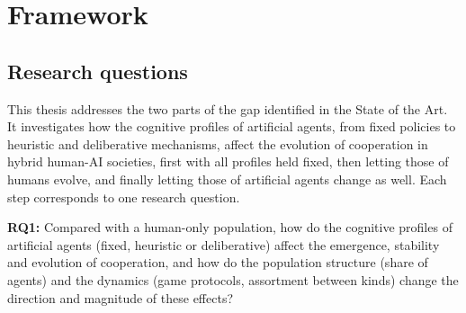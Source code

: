 %
%

\section{Framework}
\label{sec:framework}

\subsection{Research questions}

This thesis addresses the two parts of the gap identified in the State of the Art. It investigates how the cognitive profiles of artificial agents, from fixed policies to heuristic and deliberative mechanisms, affect the evolution of cooperation in hybrid human-AI societies, first with all profiles held fixed, then letting those of humans evolve, and finally letting those of artificial agents change as well. Each step corresponds to one research question.

\textbf{RQ1:} Compared with a human-only population, how do the cognitive profiles of artificial agents (fixed, heuristic or deliberative) affect the emergence, stability and evolution of cooperation, and how do the population structure (share of agents) and the dynamics (game protocols, assortment between kinds) change the direction and magnitude of these effects?

